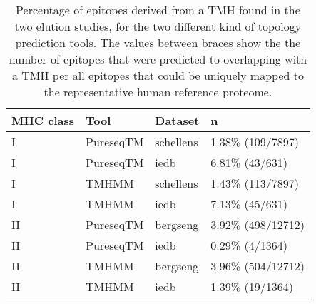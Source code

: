 \begin{table}[ht]
\centering
\begin{tabular}{llll}
  \hline
MHC class & Tool & Dataset & n \\ 
  \hline
I & PureseqTM & schellens & 1.38\% (109/7897) \\ 
  I & PureseqTM & iedb & 6.81\% (43/631) \\ 
  I & TMHMM & schellens & 1.43\% (113/7897) \\ 
  I & TMHMM & iedb & 7.13\% (45/631) \\ 
  II & PureseqTM & bergseng & 3.92\% (498/12712) \\ 
  II & PureseqTM & iedb & 0.29\% (4/1364) \\ 
  II & TMHMM & bergseng & 3.96\% (504/12712) \\ 
  II & TMHMM & iedb & 1.39\% (19/1364) \\ 
   \hline
\end{tabular}
\caption{Percentage of epitopes derived from a TMH found in the two elution studies, for the two different kind of topology prediction tools. The values between braces show the the number of epitopes that were predicted to overlapping with a TMH per all epitopes that could be uniquely mapped to the representative human reference proteome.} 
\label{tab:elution}
\end{table}
